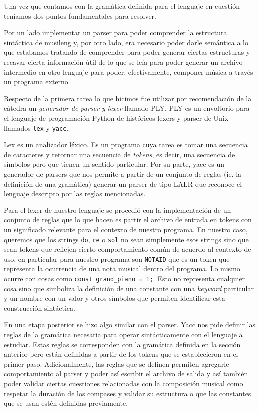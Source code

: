 Una vez que contamos con la gramática definida para el lenguaje en cuestión teníamos dos puntos fundamentales para resolver. 

Por un lado implementar un parser para poder comprender la estructura sintáctica de musileng y, por otro lado, 
era necesario poder darle semántica a lo que estabamos tratando de comprender para poder generar ciertas estructuras y recavar 
cierta información útil de lo que se leía para poder generar un archivo intermedio en otro lenguaje para poder, efectivamente,
componer música a través un programa externo.

Respecto de la primera tarea lo que hicimos fue utilizar por recomendación de la cátedra un \emph{generador de parser y lexer} llamado
PLY. PLY es un envoltorio para el lenguaje de programación Python de históricos lexers y parser de Unix llamados \texttt{lex} y \texttt{yacc}.

Lex es un analizador léxico. Es un programa cuya tarea es tomar una secuencia de caracteres y retornar una secuencia de \emph{tokens}, es decir,
una secuencia de símbolos pero que tienen un sentido particular. Por su parte, yacc es un generador de parsers que nos permite a partir de un
conjunto de reglas (ie. la definición de una gramática) generar un parser de tipo LALR que reconoce el lenguaje descripto por las reglas mencionadas.

Para el lexer de nuestro lenguaje se procedió con la implementación de un conjunto de reglas que lo que hacen es partir el archivo de entrada
en tokens con un significado relevante para el contexto de nuestro programa. En nuestro caso, queremos que los strings \texttt{do}, \texttt{re} o
\texttt{sol} no sean simplemente esos strings sino que sean tokens que reflejen cierto comportamiento común de acuerdo al contexto de uso, en particular
para nuestro programa son \texttt{NOTAID} que es un token que representa la ocurrencia de una nota musical dentro del programa. Lo mismo ocurre
con cosas como \texttt{const grand\_piano = 1;}. Esto no representa cualquier cosa sino que simboliza la definición de una constante con una
\emph{keyword} particular y un nombre con un valor y otros símbolos que permiten identificar esta construcción sintáctica.

En una etapa posterior se hizo algo similar con el parser. Yacc nos pide definir las reglas de la gramática necesaria para operar
sintácticamente con el lenguaje a estudiar. Estas reglas se corresponden con la gramática definida en la sección anterior pero están
definidas a partir de los tokens que se establecieron en el primer paso. Adicionalmente, las reglas que se definen permiten agregarle comportamiento 
al parser y poder así escribir el archivo de salida y así también poder validar ciertas cuestiones relacionadas con la composición musical
como respetar la duración de los compases y validar su estructura o que las constantes que se usan estén definidas previamente.

